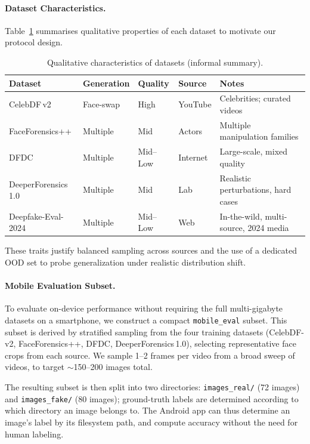\paragraph{Dataset Characteristics.} Table~\ref{tab:dataset_characteristics} summarises qualitative properties of each dataset to motivate our protocol design.
\begin{table}[h]
  \centering
  \caption{Qualitative characteristics of datasets (informal summary).}
  \label{tab:dataset_characteristics}
  {\small
  \begin{tabular}{lllll}
    \toprule
    Dataset & Generation & Quality & Source & Notes \\
    \midrule
    CelebDF\,v2 & Face\hyp swap & High & YouTube & Celebrities; curated videos \\
    FaceForensics++ & Multiple & Mid & Actors & Multiple manipulation families \\
    DFDC & Multiple & Mid--Low & Internet & Large\hyp scale, mixed quality \\
    DeeperForensics\,1.0 & Multiple & Mid & Lab & Realistic perturbations, hard cases \\
    Deepfake\hyp Eval\hyp 2024 & Multiple & Mid--Low & Web & In\hyp the\hyp wild, multi\hyp source, 2024 media \\
    \bottomrule
  \end{tabular}}
\end{table}
These traits justify balanced sampling across sources and the use of a dedicated OOD set to probe generalization under realistic distribution shift.

\paragraph{Mobile Evaluation Subset.}
To evaluate on\hyp device performance without requiring the full multi\hyp gigabyte datasets on a smartphone, we construct a compact \texttt{mobile\_eval} subset. This subset is derived by stratified sampling from the four training datasets (CelebDF\hyp v2, FaceForensics++, DFDC, DeeperForensics\,1.0), selecting representative face crops from each source. We sample 1--2 frames per video from a broad sweep of videos, to target $\sim$150--200 images total.

The resulting subset is then split into two directories: \texttt{images\_real/} (72 images) and \texttt{images\_fake/} (80 images); ground\hyp truth labels are determined according to which directory an image belongs to. The Android app can thus determine an image's label by its filesystem path, and compute accuracy without the need for human labeling.

